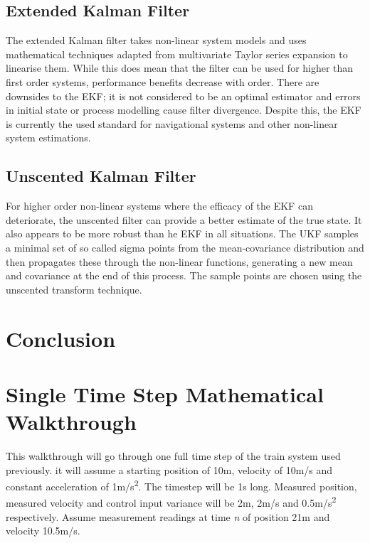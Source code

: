 \documentclass[12pt]{article}
\begin{document}
\subsection{Extended Kalman Filter}
The extended Kalman filter takes non-linear system models and uses mathematical techniques adapted from multivariate Taylor series expansion to linearise them. While this does mean that the filter can be used for higher than first order systems, performance benefits decrease with order.\cite{einicke2012smoothing} There are downsides to the EKF; it is not considered to be an optimal estimator and errors in initial state or process modelling cause filter divergence.\cite{huang2008analysis} Despite this, the EKF is currently the used standard for navigational systems and other non-linear system estimations.

\subsection{Unscented Kalman Filter}
For higher order non-linear systems where the efficacy of the EKF can deteriorate, the unscented filter can provide a better estimate of the true state. It also appears to be more robust than he EKF in all situations.\cite{gustafsson2012some} The UKF samples a minimal set of so called sigma points from the mean-covariance distribution and then propagates these through the non-linear functions, generating a new mean and covariance at the end of this process. The sample points are chosen using the unscented transform technique.\cite{julier1997new}\cite{julier2004unscented}

\section{Conclusion}




\nocite{faragher2012basis}

\newpage
\onecolumn
{}
\section{Single Time Step Mathematical Walkthrough}\label{appendix.maths}
This walkthrough will go through one full time step of the train system used previously. it will assume a starting position of 10m, velocity of 10m/s and constant acceleration of 1m/s\textsuperscript{2}. The timestep will be 1s long. Measured position, measured velocity and control input variance will be 2m, 2m/s and 0.5m/s\textsuperscript{2} respectively. Assume measurement readings at time \textit{n} of position 21m and velocity 10.5m/s.
\end{document}
